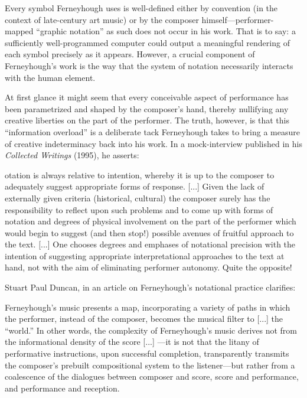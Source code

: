         Every symbol Ferneyhough uses is well-defined either by convention (in the context of late-century art music) or by the composer himself---performer-mapped ``graphic notation'' as such does not occur in his work. That is to say: a sufficiently well-programmed computer could output a meaningful rendering of each symbol precisely as it appears. However, a crucial component of Ferneyhough's work is the way that the system of notation necessarily interacts with the human element. 

        At first glance it might seem that every conceivable aspect of performance has been parametrized and shaped by the composer's hand, thereby nullifying any creative liberties on the part of the performer. The truth, however, is that this ``information overload'' is a deliberate tack Ferneyhough takes to bring a measure of creative indeterminacy back into his work. In a mock-interview published in his \textit{Collected Writings} (1995), he asserts:

        \begin{smallquote}
            [N]otation is always relative to intention, whereby it is up to the composer to adequately suggest appropriate forms of response. [...] Given the lack of externally given criteria (historical, cultural) the composer surely has the responsibility to reflect upon such problems and to come up with forms of notation and degrees of physical involvement on the part of the performer which would begin to suggest (and then stop!) possible avenues of fruitful approach to the text. [...] One chooses degrees and emphases of notational precision with the intention of suggesting appropriate interpretational approaches to the text at hand, not with the aim of eliminating performer autonomy. Quite the opposite!\autocite[70-1]{Ferneyhough_1995}
        \end{smallquote}
        
        Stuart Paul Duncan, in an article on Ferneyhough's notational practice clarifies:

        \begin{smallquote}
            [...] Ferneyhough's music presents a map, incorporating a variety of paths in which the performer, instead of the composer, becomes the musical filter to [...] the ``world.'' In other words, the complexity of Ferneyhough's music derives not from the informational density of the score [...] ---it is not that the litany of performative instructions, upon successful completion, transparently transmits the composer's prebuilt compositional system to the listener---but rather from a coalescence of the dialogues between composer and score, score and performance, and performance and reception. \autocite[138-9]{Duncan_2010}
        \end{smallquote}


